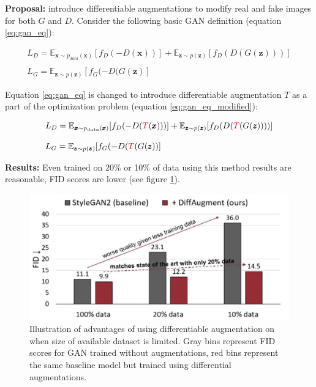 {\bf Proposal:} introduce differentiable augmentations to modify real and fake images for both $G$ and $D$. Consider the following basic GAN definition (equation \ref{eq:gan_eq}):

\begin{equation}
  \begin{array}{l}
    L_D = \mathbb{E}_{\pmb{x} \sim p_{data}(\pmb{x})} [f_D(-D(\pmb{x}))] + \mathbb{E}_{\pmb{z} \sim p(\pmb{z})} [f_D(D(G(\pmb{z})))] \\
    \\
    L_G = \mathbb{E}_{\pmb{z} \sim p(\pmb{z})} [f_G(-D(G(\pmb{z})]
  \end{array}
  \label{eq:gan_eq}
\end{equation}

Equation \ref{eq:gan_eq} is changed to introduce differentiable augmentation $T$ as a part of the optimization problem (equation \ref{eq:gan_eq_modified}):

\begin{equation}
  \begin{array}{l}
    L_D = \mathbb{E}_{\pmb{x} \sim p_{data}(\pmb{x})} [f_D(-D(\textcolor{red}{T}(\pmb{x})))] + \mathbb{E}_{\pmb{z} \sim p(\pmb{z})} [f_D(D(\textcolor{red}{T}(G(\pmb{z}))))] \\
    \\
    L_G = \mathbb{E}_{\pmb{z} \sim p(\pmb{z})} [f_G(-D(\textcolor{red}{T}(G(\pmb{z}))]
  \end{array}
  \label{eq:gan_eq_modified}
\end{equation} 

{\bf Results:} Even trained on 20\% or 10\% of data using this method results are reasonable, FID \cite{HeuselRUNH17} scores are lower (see figure \ref{fig:diff_aug_fid}).\\ 

\begin{figure}[h!]
    \centering
    \includegraphics[scale=0.4]{neurips-2020/images/Screenshot 2020-12-11 at 10.43.05.png}
    \caption{Illustration of advantages of using differentiable augmentation on when size of available dataset is limited. Gray bins represent FID scores for GAN trained without augmentations, red bins represent the same baseline model but trained using differential augmentations.}
    \label{fig:diff_aug_fid}
\end{figure}

